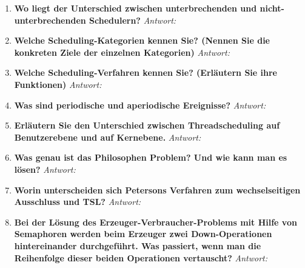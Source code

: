 \begin{enumerate}[label=\arabic*.]
      \item \textbf{Wo liegt der Unterschied zwischen unterbrechenden und nicht-unterbrechenden
                  Schedulern?} \newline
            \textit{Antwort:}

      \item \textbf{Welche Scheduling-Kategorien kennen Sie? (Nennen Sie die konkreten Ziele der einzelnen
                  Kategorien)} \newline
            \textit{Antwort:}

      \item \textbf{Welche Scheduling-Verfahren kennen Sie? (Erläutern Sie ihre Funktionen)} \newline
            \textit{Antwort:}

      \item \textbf{Was sind periodische und aperiodische Ereignisse?} \newline
            \textit{Antwort:}

      \item \textbf{Erläutern Sie den Unterschied zwischen Threadscheduling auf Benutzerebene und auf
                  Kernebene.} \newline
            \textit{Antwort:}

      \item \textbf{Was genau ist das Philosophen Problem? Und wie kann man es lösen?} \newline
            \textit{Antwort:}

      \item \textbf{Worin unterscheiden sich Petersons Verfahren zum wechselseitigen Ausschluss und TSL?} \newline
            \textit{Antwort:}

      \item \textbf{Bei der Lösung des Erzeuger-Verbraucher-Problems mit Hilfe von Semaphoren werden
                  beim Erzeuger zwei Down-Operationen hintereinander durchgeführt. Was passiert, wenn
                  man die Reihenfolge dieser beiden Operationen vertauscht?} \newline
            \textit{Antwort:}

\end{enumerate}